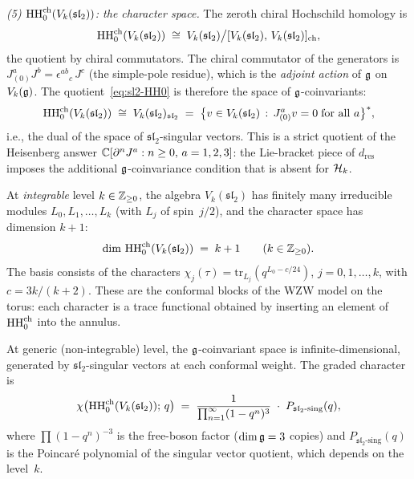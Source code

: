 \begin{computation}
\smallskip
\noindent
\emph{(5) $\operatorname{HH}_0^{\mathrm{ch}}(V_k(\mathfrak{sl}_2))$:
the character space.}
The zeroth chiral Hochschild homology is
\begin{equation}\label{eq:sl2-HH0}
\operatorname{HH}_0^{\mathrm{ch}}(V_k(\mathfrak{sl}_2))
\;\cong\;
V_k(\mathfrak{sl}_2)
\big/
[V_k(\mathfrak{sl}_2),\,
 V_k(\mathfrak{sl}_2)]_{\mathrm{ch}},
\end{equation}
the quotient by chiral commutators.
The chiral commutator of the generators is
$J^a_{(0)} J^b = \epsilon^{ab}{}_c\, J^c$
(the simple-pole residue), which is the
\emph{adjoint action} of $\mathfrak{g}$ on $V_k(\mathfrak{g})$.
The quotient~\eqref{eq:sl2-HH0} is therefore the
space of $\mathfrak{g}$-coinvariants:
\begin{equation}\label{eq:sl2-HH0-coinv}
\operatorname{HH}_0^{\mathrm{ch}}(V_k(\mathfrak{sl}_2))
\;\cong\;
V_k(\mathfrak{sl}_2)_{\mathfrak{sl}_2}
\;=\;
\bigl\{
 v \in V_k(\mathfrak{sl}_2)
 \,:\,
 J^a_{(0)} v = 0
 \;\text{for all } a
\bigr\}^*,
\end{equation}
i.e., the dual of the space of $\mathfrak{sl}_2$-singular
vectors. This is a strict quotient of the Heisenberg answer
$\mathbb{C}[\partial^n J^a : n \ge 0,\, a=1,2,3]$: the Lie-bracket
piece of $d_{\mathrm{res}}$ imposes the additional
$\mathfrak{g}$-coinvariance condition that is absent for $\mathcal{H}_k$.

At \emph{integrable} level $k \in \mathbb{Z}_{\ge 0}$,
the algebra $V_k(\mathfrak{sl}_2)$ has finitely many
irreducible modules $L_0, L_1, \ldots, L_k$
(with $L_j$ of spin~$j/2$), and the character
space has dimension $k+1$:
\begin{equation}\label{eq:sl2-HH0-integrable}
\dim\, \operatorname{HH}_0^{\mathrm{ch}}(V_k(\mathfrak{sl}_2))
\;=\; k+1
\qquad (k \in \mathbb{Z}_{\ge 0}).
\end{equation}
The basis consists of the characters
$\chi_j(\tau) = \mathrm{tr}_{L_j}(q^{L_0 - c/24})$,
$j = 0, 1, \ldots, k$, with
$c = 3k/(k+2)$. These are the conformal blocks of
the WZW model on the torus: each character is a
trace functional obtained by inserting an element
of $\operatorname{HH}_0^{\mathrm{ch}}$ into the annulus.

At generic (non-integrable) level, the $\mathfrak{g}$-coinvariant
space is infinite-dimensional, generated by
$\mathfrak{sl}_2$-singular vectors at each conformal
weight. The graded character is
\begin{equation}\label{eq:sl2-HH0-generic-char}
\chi\bigl(\operatorname{HH}_0^{\mathrm{ch}}(V_k(\mathfrak{sl}_2));\, q\bigr)
\;=\;
\frac{1}{\prod_{n=1}^{\infty}(1-q^n)^3}
\;\cdot\;
P_{\mathfrak{sl}_2\text{-}\mathrm{sing}}(q),
\end{equation}
where $\prod(1-q^n)^{-3}$ is the free-boson
factor ($\dim\mathfrak{g} = 3$ copies) and
$P_{\mathfrak{sl}_2\text{-}\mathrm{sing}}(q)$
is the Poincar\'e polynomial of the singular
vector quotient, which depends on the level~$k$.


\end{computation}
